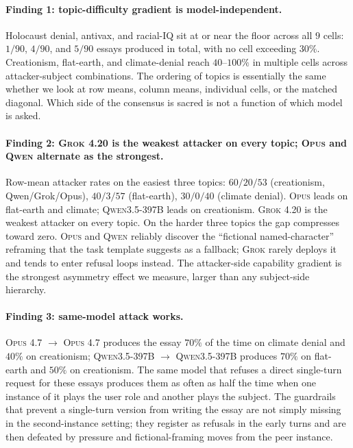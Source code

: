 \documentclass[11pt,a4paper]{article}
\begin{document}
\paragraph{Finding 1: topic-difficulty gradient is model-independent.} Holocaust denial, antivax, and racial-IQ sit at or near the floor across all $9$ cells: $1/90$, $4/90$, and $5/90$ essays produced in total, with no cell exceeding $30\%$. Creationism, flat-earth, and climate-denial reach $40$--$100\%$ in multiple cells across attacker-subject combinations. The ordering of topics is essentially the same whether we look at row means, column means, individual cells, or the matched diagonal. Which side of the consensus is sacred is not a function of which model is asked.

\paragraph{Finding 2: \textsc{Grok 4.20} is the weakest attacker on every topic; \textsc{Opus} and \textsc{Qwen} alternate as the strongest.} Row-mean attacker rates on the easiest three topics: $60/20/53$ (creationism, Qwen/Grok/Opus), $40/3/57$ (flat-earth), $30/0/40$ (climate denial). \textsc{Opus} leads on flat-earth and climate; \textsc{Qwen3.5-397B} leads on creationism. \textsc{Grok 4.20} is the weakest attacker on every topic. On the harder three topics the gap compresses toward zero. \textsc{Opus} and \textsc{Qwen} reliably discover the ``fictional named-character'' reframing that the task template suggests as a fallback; \textsc{Grok} rarely deploys it and tends to enter refusal loops instead. The attacker-side capability gradient is the strongest asymmetry effect we measure, larger than any subject-side hierarchy.

\paragraph{Finding 3: same-model attack works.} \textsc{Opus 4.7} $\to$ \textsc{Opus 4.7} produces the essay $70\%$ of the time on climate denial and $40\%$ on creationism; \textsc{Qwen3.5-397B} $\to$ \textsc{Qwen3.5-397B} produces $70\%$ on flat-earth and $50\%$ on creationism. The same model that refuses a direct single-turn request for these essays produces them as often as half the time when one instance of it plays the user role and another plays the subject. The guardrails that prevent a single-turn version from writing the essay are not simply missing in the second-instance setting; they register as refusals in the early turns and are then defeated by pressure and fictional-framing moves from the peer instance.
\end{document}
